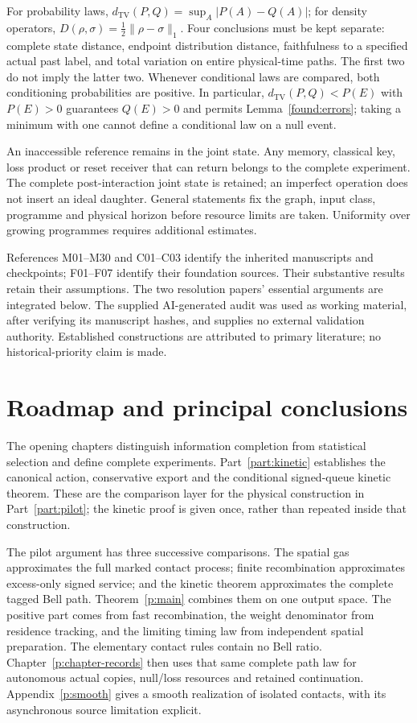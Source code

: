 \documentclass[11pt,oneside,openany]{book}
\theoremstyle{definition}
\theoremstyle{remark}\newtheorem{remark}[theorem]{Remark}
\providecommand{\TV}{d_{\mathrm{TV}}}
\begin{document}
For probability laws, $\TV(P,Q)=\sup_A|P(A)-Q(A)|$; for density operators,
$D(\rho,\sigma)=\tfrac12\|\rho-\sigma\|_1$. Four conclusions must be kept
separate: complete state distance, endpoint distribution distance,
faithfulness to a specified actual past label, and total variation on
entire physical-time paths. The first two do not imply the latter two.
Whenever conditional laws are compared, both conditioning probabilities
are positive. In particular, $\TV(P,Q)<P(E)$ with $P(E)>0$ guarantees
$Q(E)>0$ and permits Lemma~\ref{found:errors}; taking a minimum with one
cannot define a conditional law on a null event.

An inaccessible reference remains in the joint state. Any memory,
classical key, loss product or reset receiver that can return belongs to
the complete experiment. The complete post-interaction joint state is
retained; an imperfect operation does not insert an ideal daughter. General
statements fix the graph, input class, programme and physical horizon
before resource limits are taken. Uniformity over growing programmes
requires additional estimates.

References M01--M30 and C01--C03 identify the inherited manuscripts and
checkpoints; F01--F07 identify their foundation sources. Their substantive
results retain their assumptions. The two resolution papers' essential
arguments are integrated below. The supplied AI-generated audit was used
as working material, after verifying its manuscript hashes, and supplies
no external validation authority. Established constructions are attributed
to primary literature; no historical-priority claim is made.

\chapter*{Roadmap and principal conclusions}
The opening chapters distinguish information completion from statistical
selection and define complete experiments. Part~\ref{part:kinetic}
establishes the canonical action, conservative export and the conditional
signed-queue kinetic theorem. These are the comparison layer for the
physical construction in Part~\ref{part:pilot}; the kinetic proof is given
once, rather than repeated inside that construction.

The pilot argument has three successive comparisons. The spatial gas
approximates the full marked contact process; finite recombination
approximates excess-only signed service; and the kinetic theorem
approximates the complete tagged Bell path. Theorem~\ref{p:main}
combines them on one output space. The positive part comes from fast
recombination, the weight denominator from residence tracking, and the
limiting timing law from independent spatial preparation. The elementary
contact rules contain no Bell ratio. Chapter~\ref{p:chapter-records}
then uses that same complete path law for autonomous actual copies,
null/loss resources and retained continuation. Appendix~\ref{p:smooth}
gives a smooth realization of isolated contacts, with its asynchronous
source limitation explicit.
\end{document}
